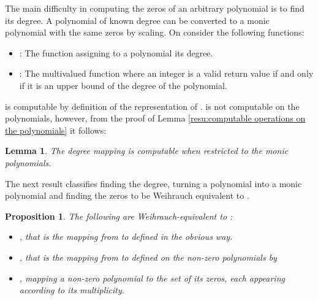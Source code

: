 \documentclass{eptcs-modified}
\newtheorem{proposition}[theorem]{Proposition}
\newtheorem{lemma}[theorem]{Lemma}
\begin{document}
			The main difficulty in computing the zeros of an arbitrary polynomial is to find its degree.
			A polynomial of known degree can be converted to a monic polynomial with the same zeros by scaling.
			On  consider the following functions:
			\begin{itemize}
				\item : The function assigning to a polynomial its degree.
				\item : The multivalued function where an integer is a valid return value if and only if it is an upper bound of the degree of the polynomial.
			\end{itemize}
			 is computable by definition of the representation of .
			 is not computable on the polynomials, however, from the proof of Lemma \ref{resu:computable operations on the polynomials} it follows:
			\begin{lemma}\label{resu:deg on the monics}
				The degree mapping is computable when restricted to the monic polynomials.
			\end{lemma}
			The next result classifies finding the degree, turning a polynomial into a monic polynomial and finding the zeros to be Weihrauch equivalent to .

			\begin{proposition}
				The following are Weihrauch-equivalent to :
				\begin{itemize}
					\item , that is the mapping from  to  defined in the obvious way.
					\item , that is the mapping from  to  defined on the non-zero polynomials by
					
					\item , mapping a non-zero polynomial to the set of its zeros, each appearing according to its multiplicity.
				\end{itemize}
			\end{proposition}
\end{document}
